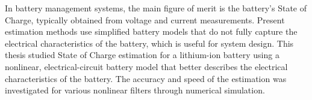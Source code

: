 In battery management systems, the main figure of merit is the battery's State of Charge, typically obtained from voltage and current measurements.
Present estimation methods use simplified battery models that do not fully capture the electrical characteristics of the battery, which is useful for system design.
This thesis studied State of Charge estimation for a lithium-ion battery using a nonlinear, electrical-circuit battery model that better describes the electrical characteristics of the battery.
The accuracy and speed of the estimation was investigated for various nonlinear filters through numerical simulation.
